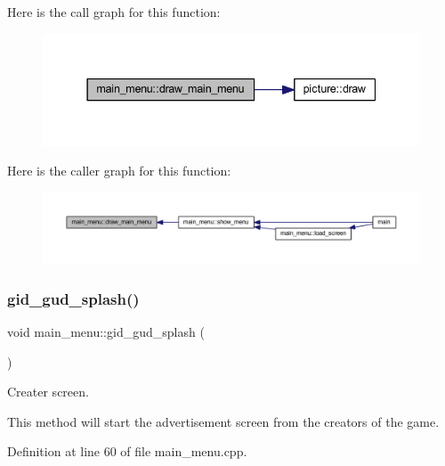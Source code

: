 Here is the call graph for this function\+:
\nopagebreak
\begin{figure}[H]
\begin{center}
\leavevmode
\includegraphics[width=337pt]{classmain__menu_a2f5aeef38a566a25311f77bc24b8c8b5_cgraph}
\end{center}
\end{figure}
Here is the caller graph for this function\+:
\nopagebreak
\begin{figure}[H]
\begin{center}
\leavevmode
\includegraphics[width=350pt]{classmain__menu_a2f5aeef38a566a25311f77bc24b8c8b5_icgraph}
\end{center}
\end{figure}
\mbox{\label{classmain__menu_a555c4191cafced116939b5c6c354fe3e}} 
\subsubsection{\texorpdfstring{gid\+\_\+gud\+\_\+splash()}{gid\_gud\_splash()}}
{\footnotesize\ttfamily void main\+\_\+menu\+::gid\+\_\+gud\+\_\+splash (\begin{DoxyParamCaption}{ }\end{DoxyParamCaption})}



Creater screen. 

This method will start the advertisement screen from the creators of the game. ~\newline


Definition at line 60 of file main\+\_\+menu.\+cpp.

